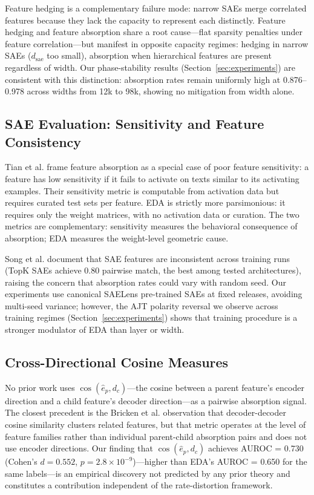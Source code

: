 \documentclass{article}
\begin{document}
Feature hedging \cite{chanin2025hedging} is a complementary failure mode: narrow SAEs
merge correlated features because they lack the capacity to represent each distinctly. Feature
hedging and feature absorption share a root cause---flat sparsity penalties under feature
correlation---but manifest in opposite capacity regimes: hedging in narrow SAEs
($d_\text{sae}$ too small), absorption when hierarchical features are present regardless of
width. Our phase-stability results (Section~\ref{sec:experiments}) are consistent with
this distinction: absorption rates remain uniformly high at 0.876--0.978 across widths from
12k to 98k, showing no mitigation from width alone.


\subsection{SAE Evaluation: Sensitivity and Feature Consistency}

Tian et al. \citeyear{tian2025sensitivity} frame feature absorption as a special case of poor
feature sensitivity: a feature has low sensitivity if it fails to activate on texts similar
to its activating examples. Their sensitivity metric is computable from activation data but
requires curated test sets per feature. EDA is strictly more parsimonious: it requires only
the weight matrices, with no activation data or curation. The two metrics are complementary:
sensitivity measures the behavioral consequence of absorption; EDA measures the weight-level
geometric cause.

Song et al. \citeyear{song2025consistency} document that SAE features are inconsistent across
training runs (TopK SAEs achieve 0.80 pairwise match, the best among tested architectures),
raising the concern that absorption rates could vary with random seed. Our experiments use
canonical SAELens pre-trained SAEs at fixed releases, avoiding multi-seed variance; however,
the AJT polarity reversal we observe across training regimes (Section~\ref{sec:experiments})
shows that training procedure is a stronger modulator of EDA than layer or width.


\subsection{Cross-Directional Cosine Measures}

No prior work uses $\cos(\hat{e}_p, d_c)$---the cosine between a parent feature's encoder
direction and a child feature's decoder direction---as a pairwise absorption signal. The
closest precedent is the Bricken et al. \citeyear{bricken2023monosemanticity} observation
that decoder-decoder cosine similarity clusters related features, but that metric operates at
the level of feature families rather than individual parent-child absorption pairs and does not
use encoder directions. Our finding that $\cos(\hat{e}_p, d_c)$ achieves AUROC = 0.730
(Cohen's $d = 0.552$, $p = 2.8 \times 10^{-9}$)---higher than EDA's AUROC = 0.650 for the
same labels---is an empirical discovery not predicted by any prior theory and constitutes a
contribution independent of the rate-distortion framework.
\end{document}
